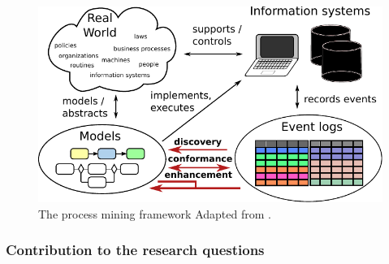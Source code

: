 \documentclass[a4paper,11pt]{article}
\begin{document}
\begin{figure}
	\centering
	\includegraphics[width=0.6\linewidth]{figures/process-mining-big-picture}
	\caption{The process mining framework Adapted from \cite{VanderAalst2016b}.}
	\label{fig:process-mining}
\end{figure}




\subsubsection{Contribution to the research questions} 
\end{document}
